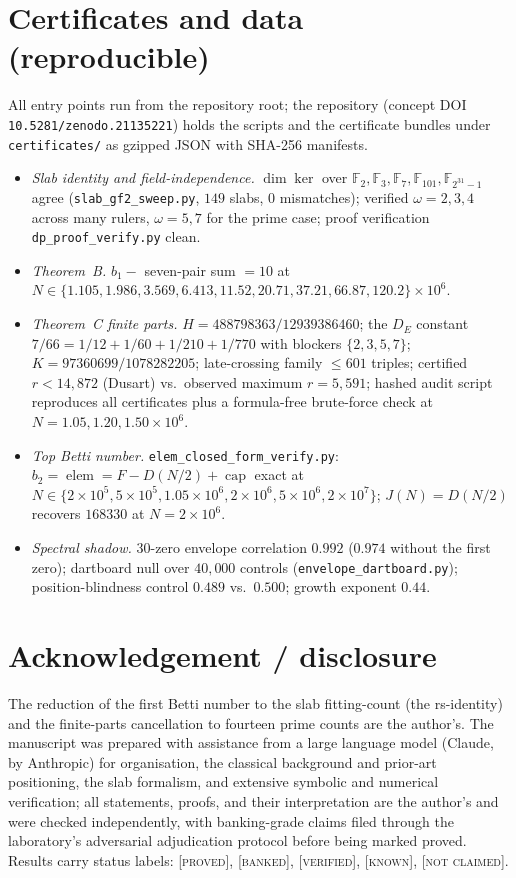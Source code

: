 \documentclass[11pt,reqno]{amsart}
\theoremstyle{plain}
\theoremstyle{definition}
\theoremstyle{plain}
\newcommand{\elem}{\operatorname{elem}}
\newcommand{\cpc}{\operatorname{cap}}
\newcommand{\F}{\mathbb{F}}
\newcommand{\st}{\textsc}
\begin{document}
\section{Certificates and data (reproducible)}
All entry points run from the repository root; the repository (concept
DOI \texttt{10.5281/zenodo.21135221}) holds the scripts and the certificate bundles under
\texttt{certificates/} as gzipped JSON with SHA-256 manifests.
\begin{itemize}
\item \emph{Slab identity and field-independence.} $\dim\ker$ over $\F_2,\F_3,\F_7,\F_{101},
\F_{2^{31}-1}$ agree (\texttt{slab\_gf2\_sweep.py}, $149$ slabs, $0$ mismatches); verified
$\omega=2,3,4$ across many rulers, $\omega=5,7$ for the prime case; proof verification
\texttt{dp\_proof\_verify.py} clean.
\item \emph{Theorem~B.} $b_1-$ seven-pair sum $=10$ at $N\in\{1.105,1.986,3.569,6.413,11.52,
20.71,37.21,66.87,120.2\}\times10^6$.
\item \emph{Theorem~C finite parts.} $H=488798363/12939386460$; the $D_E$ constant
$7/66=1/12+1/60+1/210+1/770$ with blockers $\{2,3,5,7\}$; $K=97360699/1078282205$; late-crossing
family $\le601$ triples; certified $r<14{,}872$ (Dusart) vs.\ observed maximum $r=5{,}591$;
hashed audit script reproduces all certificates plus a formula-free brute-force check at
$N=1.05,1.20,1.50\times10^6$.
\item \emph{Top Betti number.} \texttt{elem\_closed\_form\_verify.py}: $b_2=\elem=F-D(N/2)+\cpc$
exact at $N\in\{2\times10^5,5\times10^5,1.05\times10^6,2\times10^6,5\times10^6,2\times10^7\}$;
$J(N)=D(N/2)$ recovers $168330$ at $N=2\times10^6$.
\item \emph{Spectral shadow.} $30$-zero envelope correlation $0.992$ ($0.974$ without the first
zero); dartboard null over $40{,}000$ controls (\texttt{envelope\_dartboard.py});
position-blindness control $0.489$ vs.\ $0.500$; growth exponent $0.44$.
\end{itemize}

\section*{Acknowledgement / disclosure}
The reduction of the first Betti number to the slab fitting-count (the rs-identity) and the
finite-parts cancellation to fourteen prime counts are the author's. The manuscript was prepared
with assistance from a large language model (Claude, by Anthropic) for organisation, the
classical background and prior-art positioning, the slab formalism, and extensive symbolic and
numerical verification; all statements, proofs, and their interpretation are the author's and
were checked independently, with banking-grade claims filed through the laboratory's adversarial
adjudication protocol before being marked proved. Results carry status labels: \st{[proved]},
\st{[banked]}, \st{[verified]}, \st{[known]}, \st{[not claimed]}.
\end{document}
